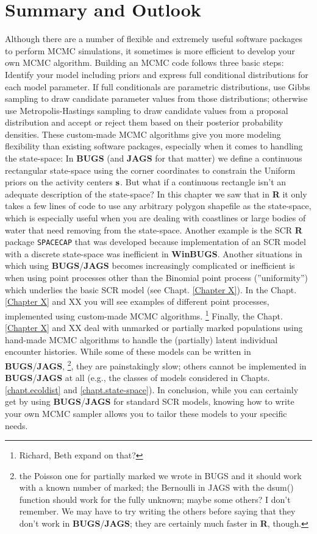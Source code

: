 \section{Summary and Outlook}

Although there are a number of flexible and extremely useful software 
packages to perform MCMC simulations, it sometimes is more efficient to 
develop your own MCMC algorithm. Building an MCMC code follows three basic 
steps: Identify your model including priors and express full conditional 
distributions for each model parameter. If full conditionals are parametric 
distributions, use Gibbs sampling to draw candidate parameter values from 
those distributions; otherwise use Metropolis-Hastings sampling to draw 
candidate values from a proposal distribution and accept or reject them 
based on their posterior probability densities.
These custom-made MCMC algorithms give you more modeling flexibility than 
existing software packages, especially when it comes to handling the
 state-space: In {\bf BUGS} (and {\bf JAGS} for that matter) we define
  a continuous rectangular state-space using the corner coordinates to 
  constrain the Uniform priors on the activity centers ${\bf s}$.
   But what if a continuous rectangle isn't an adequate description of 
   the state-space? In this chapter we saw that in {\bf R} it only takes 
   a few lines of code to use any arbitrary polygon shapefile as the 
   state-space, which is especially useful when you are dealing with 
   coastlines or large bodies of water that need removing from the 
   state-space. Another example is the SCR {\bf R} package \mbox{\tt SPACECAP}
    \citep{gopalaswamy_etal:2011} that was developed because implementation
     of an SCR model with a discrete state-space was inefficient in {\bf WinBUGS}.
Another situations in which using {\bf BUGS}/{\bf JAGS} becomes
increasingly
complicated or inefficient is when using point processes other 
than the 
 Binomial point process (''uniformity'') which underlies the basic 
 SCR model (see Chapt. \ref {Chapter X}). In the Chapt. 
 \ref {Chapter X} and XX you will see examples of different point processes,
  implemented using custom-made MCMC algorithms.
   \footnote{Richard, Beth expand on that?}
Finally, the Chapt. \ref {Chapter X} and XX deal with unmarked or 
partially marked populations using hand-made MCMC algorithms to 
handle the (partially) latent individual encounter histories. 
While some of these models can be written in {\bf BUGS}/{\bf JAGS}, 
\footnote{the Poisson one for partially marked we wrote in BUGS and it 
should work with a known number of marked; the Bernoulli in JAGS with the 
dsum() function should work for the fully unknown; maybe some others?
 I don’t remember. We may have to try writing the others before saying 
 that they don’t work in {\bf BUGS}/{\bf JAGS}; they are certainly much faster in {\bf R}, 
 though.}, they are painstakingly slow; others cannot be implemented in 
 {\bf BUGS}/{\bf JAGS} at all (e.g., the classes of models
 considered in Chapts. \ref{chapt.ecoldist} and  \ref{chapt.state-space}).
In conclusion, while you can certainly get by using {\bf BUGS}/{\bf JAGS} 
for standard SCR models, knowing how to write your own MCMC sampler 
allows you to tailor these models to your specific needs.

